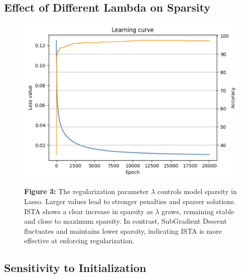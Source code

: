 \documentclass[11pt]{article}
\begin{document}


\subsection{Effect of Different Lambda on Sparsity}

\begin{figure}[H]
    \centering
    \begin{minipage}{0.3\textwidth}
        \includegraphics[width=\linewidth]{figures/fig1.png}
    \end{minipage}
    \hfill
    \begin{minipage}{0.5\textwidth}
        \small
        \textbf{Figure 3:}
        The regularization parameter \( \lambda \) controls model sparsity in Lasso. Larger values lead to stronger penalties and sparser solutions.
        ISTA shows a clear increase in sparsity as \( \lambda \) grows, remaining stable and close to maximum sparsity. In contrast, SubGradient Descent fluctuates and maintains lower sparsity, indicating ISTA is more effective at enforcing regularization.
    \end{minipage}
\end{figure}




\subsection{Sensitivity to Initialization}
\end{document}
